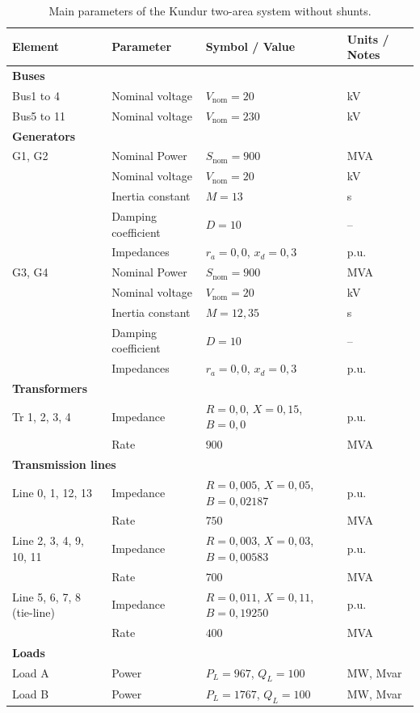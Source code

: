\begin{table}
\centering
\caption{Main parameters of the Kundur two-area system without shunts.}
\label{tab:properties_kundur}
\renewcommand{\arraystretch}{1.2}
\small
\begin{tabular}{|l|l|l|l|}
\hline
\textbf{Element} & \textbf{Parameter} & \textbf{Symbol / Value} & \textbf{Units / Notes} \\ 
\hline

\multicolumn{4}{|l|}{\textbf{Buses}} \\ 
\hline
Bus1 to 4 & Nominal voltage & $V_{\text{nom}} = 20$ & kV \\ 
Bus5 to 11 & Nominal voltage & $V_{\text{nom}} = 230$ & kV \\ 
\hline

\multicolumn{4}{|l|}{\textbf{Generators}} \\ 
\hline
G1, G2 & Nominal Power & $S_{\text{nom}} = 900$ & MVA \\ 
       & Nominal voltage & $V_{\text{nom}} = 20$ & kV \\ 
       & Inertia constant & $M = 13$ & s \\ 
       & Damping coefficient & $D = 10$ & -- \\ 
       & Impedances & $r_a = 0,0$, $x_d = 0,3$ & p.u. \\ 
G3, G4 & Nominal Power & $S_{\text{nom}} = 900$ & MVA \\ 
       & Nominal voltage & $V_{\text{nom}} = 20$ & kV \\ 
       & Inertia constant & $M = 12,35$ & s \\ 
       & Damping coefficient & $D = 10$ & -- \\ 
       & Impedances & $r_a = 0,0$, $x_d = 0,3$ & p.u. \\ 
\hline

\multicolumn{4}{|l|}{\textbf{Transformers}} \\ 
\hline
Tr 1, 2, 3, 4 & Impedance & $R = 0,0$, $X = 0,15$, $B = 0,0$ & p.u. \\ 
               & Rate & $900$ & MVA \\ 
\hline

\multicolumn{4}{|l|}{\textbf{Transmission lines}} \\ 
\hline
Line 0, 1, 12, 13 & Impedance & $R = 0,005$, $X = 0,05$, $B = 0,02187$ & p.u. \\ 
                   & Rate & $750$ & MVA \\ 
Line 2, 3, 4, 9, 10, 11 & Impedance & $R = 0,003$, $X = 0,03$, $B = 0,00583$ & p.u. \\ 
                         & Rate & $700$ & MVA \\ 
Line 5, 6, 7, 8 (tie-line) & Impedance & $R = 0,011$, $X = 0,11$, $B = 0,19250$ & p.u. \\ 
                            & Rate & $400$ & MVA \\ 
\hline
\multicolumn{4}{|l|}{\textbf{Loads}} \\ 
\hline
Load A & Power & $P_L = 967$, $Q_L = 100$ & MW, Mvar \\ 
Load B & Power & $P_L = 1767$, $Q_L = 100$ & MW, Mvar \\ 
\hline


\end{tabular}
\end{table}
